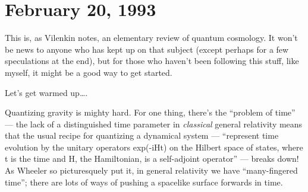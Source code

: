 \documentclass[12pt]{article}
\def\tightlist{}
\renewcommand{\texttt}[1]{%
  \begingroup
  \ttfamily
  \begingroup\lccode`~=`/\lowercase{\endgroup\def~}{/\discretionary{}{}{}}%
  \begingroup\lccode`~=`[\lowercase{\endgroup\def~}{[\discretionary{}{}{}}%
  \begingroup\lccode`~=`.\lowercase{\endgroup\def~}{.\discretionary{}{}{}}%
  \catcode`/=\active\catcode`[=\active\catcode`.=\active
  \scantokens{#1\noexpand}%
  \endgroup
}
\begin{document}
\hypertarget{week6}{%
\section{February 20, 1993}\label{week6}}

\noindent
This is, as Vilenkin notes, an elementary review of quantum cosmology.
It won't be news to anyone who has kept up on that subject (except
perhaps for a few speculations at the end), but for those who haven't
been following this stuff, like myself, it might be a good way to get
started.

Let's get warmed up\ldots.

Quantizing gravity is mighty hard. For one thing, there's the ``problem
of time'' --- the lack of a distinguished time parameter in
\emph{classical} general relativity means that the usual recipe for
quantizing a dynamical system --- ``represent time evolution by the
unitary operators exp(-iHt) on the Hilbert space of states, where t is
the time and H, the Hamiltonian, is a self-adjoint operator'' --- breaks
down! As Wheeler so picturesquely put it, in general relativity we have
``many-fingered time''; there are lots of ways of pushing a spacelike
surface forwards in time.
\end{document}
